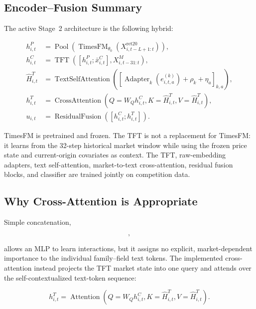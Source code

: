 \documentclass[11pt]{article}
\begin{document}
\subsection{Encoder--Fusion Summary}

The active Stage~2 architecture is the following hybrid:

\begin{equation}
\begin{aligned}
h^P_{i,t}
&=
\operatorname{Pool}\!\left(
\operatorname{TimesFM}_{\theta_0}
(X^{\mathrm{ret20}}_{i,t-L+1:t})
\right),\\
h^C_{i,t}
&=
\operatorname{TFT}
\left([h^P_{i,t};\bar x^C_{i,t}],X^M_{i,t-31:t}\right),\\
\widehat H^T_{i,t}
&=
\operatorname{TextSelfAttention}
\left([\operatorname{Adapter}_k(e^{(k)}_{i,t,a})
+\rho_k+\eta_a]_{k,a}\right),\\
h^T_{i,t}
&=
\operatorname{CrossAttention}
\left(Q=W_Qh^C_{i,t},K=\widehat H^T_{i,t},
V=\widehat H^T_{i,t}\right),\\
u_{i,t}
&=
\operatorname{ResidualFusion}([h^C_{i,t};h^T_{i,t}]).
\end{aligned}
\end{equation}

TimesFM is pretrained and frozen. The TFT is not a replacement for TimesFM:
it learns from the 32-step historical market window while using the frozen
price state and current-origin covariates as context. The TFT, raw-embedding
adapters, text self-attention, market-to-text cross-attention, residual fusion
blocks, and classifier are trained jointly on competition data.

\subsection{Why Cross-Attention is Appropriate}

Simple concatenation,

\begin{equation}
[h^P_{i,t};h^T_{i,t}],
\end{equation}

allows an MLP to learn interactions, but it assigns no explicit,
market-dependent importance to the individual family--field text tokens.
The implemented cross-attention instead projects the TFT market state into one
query and attends over the self-contextualized text-token sequence:

\begin{equation}
h^T_{i,t}
=
\operatorname{Attention}
\left(
Q=W_Qh^C_{i,t},
K=\widehat H^T_{i,t},
V=\widehat H^T_{i,t}
\right).
\end{equation}
\end{document}
